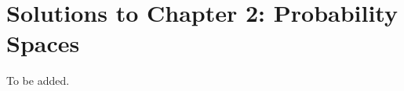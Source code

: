 \section{Solutions to Chapter 2: Probability Spaces}
\label{sec:solutions-chapter-2}

\setcounter{Lcount}{0}
\begin{list}{2.6.}{}
\item To be added.
\end{list}

\clearpage{}



